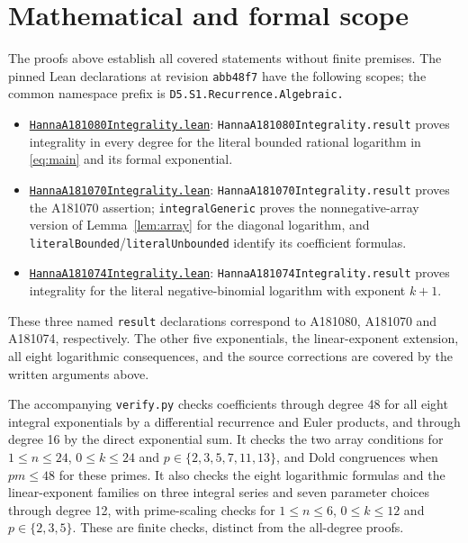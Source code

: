 \documentclass[11pt]{article}
\begin{document}
\section{Mathematical and formal scope}
The proofs above establish all covered statements without finite premises.
The pinned Lean declarations at revision \texttt{abb48f7} have the following
scopes; the common namespace prefix is
\texttt{D5.S1.Recurrence.Algebraic.}
\begin{itemize}
\raggedright
\item \href{https://github.com/the-omega-institute/trureturing/blob/abb48f723fe221da235c625800ba0d2ca1755296/D5/S1/Recurrence/Algebraic/HannaA181080Integrality.lean}{\texttt{HannaA181080Integrality.lean}}:
\texttt{HannaA181080Integrality.result} proves integrality in every degree
for the literal bounded rational logarithm in \eqref{eq:main} and its formal exponential.
\item \href{https://github.com/the-omega-institute/trureturing/blob/abb48f723fe221da235c625800ba0d2ca1755296/D5/S1/Recurrence/Algebraic/HannaA181070Integrality.lean}{\texttt{HannaA181070Integrality.lean}}:
\texttt{HannaA181070Integrality.result} proves the A181070 assertion;
\texttt{integralGeneric} proves the nonnegative-array version of
Lemma~\ref{lem:array} for the diagonal logarithm, and
\texttt{literalBounded}/\texttt{literalUnbounded} identify its coefficient formulas.
\item \href{https://github.com/the-omega-institute/trureturing/blob/abb48f723fe221da235c625800ba0d2ca1755296/D5/S1/Recurrence/Algebraic/HannaA181074Integrality.lean}{\texttt{HannaA181074Integrality.lean}}:
\texttt{HannaA181074Integrality.result} proves integrality for the literal
negative-binomial logarithm with exponent $k+1$.
\end{itemize}
These three named \texttt{result} declarations correspond to A181080,
A181070 and A181074, respectively. The other five exponentials, the
linear-exponent extension, all eight logarithmic consequences, and the
source corrections are covered by the written arguments above.

The accompanying \texttt{verify.py} checks coefficients through degree 48
for all eight integral exponentials by a differential recurrence and Euler
products, and through degree 16 by the direct exponential sum. It checks
the two array conditions for $1\leq n\leq24$, $0\leq k\leq24$ and
$p\in\{2,3,5,7,11,13\}$, and Dold congruences when $pm\leq48$ for these
primes. It also checks the eight logarithmic formulas and the linear-exponent
families on three integral series and seven parameter choices through degree 12,
with prime-scaling checks for $1\leq n\leq6$, $0\leq k\leq12$ and
$p\in\{2,3,5\}$. These are finite checks, distinct from the all-degree proofs.
\end{document}
